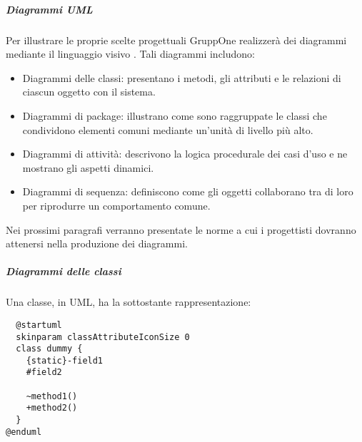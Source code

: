 \documentclass[../../norme-di-progetto.tex]{subfiles}
\begin{document}
\subparagraph{Diagrammi UML}%
\label{subp:diagrammi_UML}
Per illustrare le proprie scelte progettuali GruppOne realizzerà dei diagrammi mediante il linguaggio visivo .
Tali diagrammi includono:
\begin{itemize}
  \item Diagrammi delle classi: presentano i metodi, gli attributi e le relazioni di ciascun oggetto con il sistema.
  \item Diagrammi di package: illustrano come sono raggruppate le classi che condividono elementi comuni mediante un'unità di livello più alto.
  \item Diagrammi di attività: descrivono la logica procedurale dei casi d'uso e ne mostrano gli aspetti dinamici.
  \item Diagrammi di sequenza: definiscono come gli oggetti collaborano tra di loro per riprodurre un comportamento comune.
\end{itemize}
Nei prossimi paragrafi verranno presentate le norme a cui i progettisti dovranno attenersi nella produzione dei diagrammi.
\subparagraph{Diagrammi delle classi}%
\label{subp:diagrammi_delle_classi}
Una classe, in UML, ha la sottostante rappresentazione:
\begin{verbatim}
  @startuml
  skinparam classAttributeIconSize 0
  class dummy {
    {static}-field1
    #field2

    ~method1()
    +method2()
  }
@enduml
\end{verbatim}
\end{document}
